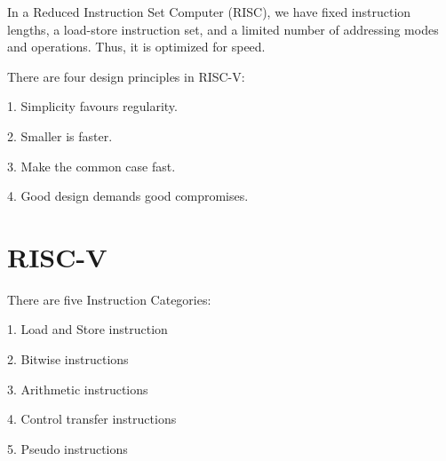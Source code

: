 In a Reduced Instruction Set Computer (RISC), we have fixed instruction lengths, a load-store instruction set, and a limited number of addressing modes and operations. Thus, it is optimized for speed.

There are four design principles in RISC-V: 

1. Simplicity favours regularity. 

2. Smaller is faster. 

3. Make the common case fast. 

4. Good design demands good compromises. 

\section{RISC-V}
There are five Instruction Categories: 

1. Load and Store instruction

2. Bitwise instructions

3. Arithmetic instructions

4. Control transfer instructions

5. Pseudo instructions

